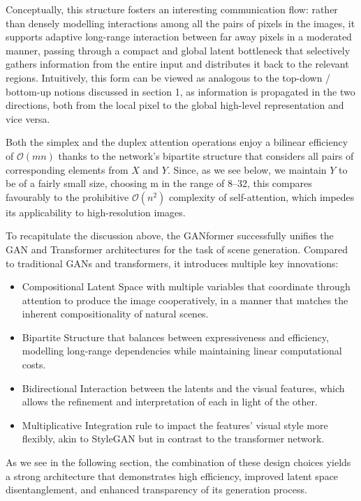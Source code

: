 \documentclass{article}
\begin{document}
	Conceptually, this structure fosters an interesting communication flow: rather than densely 
	modelling interactions among all the pairs of pixels in the images, it supports adaptive long-range 
	interaction between far away pixels in a moderated manner, passing through a compact and global 
	latent bottleneck that selectively gathers information from the entire input and distributes it back to 
	the relevant regions. Intuitively, this form can be viewed as analogous to the top-down / bottom-up 
	notions discussed in section 1, as information is propagated in the two directions, both from the 
	local pixel to the global high-level representation and vice versa.
	
	Both the simplex and the duplex attention operations enjoy a bilinear efficiency of 
	$\mathcal{O}(mn)$ thanks to the network’s bipartite structure that considers all pairs of 
	corresponding elements from $X$ and $Y$. Since, as we see below, we maintain $Y$ to be of a fairly 
	small size, choosing m in the range of 8–32, this compares favourably to the prohibitive 	
	$\mathcal{O}(n^2)$  complexity of self-attention, which impedes its applicability to high-resolution 
	images.
	
	To recapitulate the discussion above, the GANformer successfully unifies the GAN and Transformer 
	architectures for the task of scene generation. Compared to traditional GANs and transformers, it 
	introduces multiple key innovations:
	\begin{itemize}
		\item Compositional Latent Space with multiple variables that coordinate through attention to 
		produce the image cooperatively, in a manner that matches the inherent compositionality of 
		natural scenes.
		\item Bipartite Structure that balances between expressiveness and efficiency, modelling 
		long-range dependencies while maintaining linear computational costs.
		\item Bidirectional Interaction between the latents and the visual features, which allows the 
		refinement and interpretation of each in light of the other.
		\item Multiplicative Integration rule to impact the features' visual style more flexibly, akin to 
		StyleGAN but in contrast to the transformer network.
	\end{itemize}
	As we see in the following section, the combination of these design choices yields a strong 
	architecture that demonstrates high efficiency, improved latent space disentanglement, and 
	enhanced transparency of its generation process.
	
\end{document}
